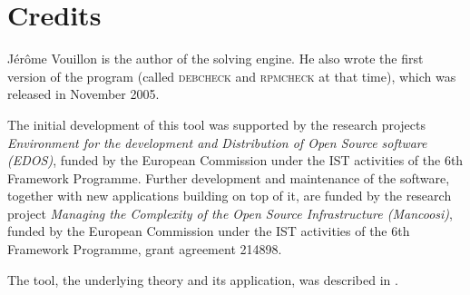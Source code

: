 \section{Credits}
\label{sec:credits}

Jérôme Vouillon is the author of the solving engine. He also wrote the
first version of the program (called \textsc{debcheck} and
\textsc{rpmcheck} at that time), which was released in November 2005.

The initial development of this tool was supported by the research
projects \emph{Environment for the development and Distribution of
  Open Source software (EDOS)}, funded by the European Commission
under the IST activities of the 6th Framework Programme. Further
development and maintenance of the software, together with new
applications building on top of it, are funded by the research project
\emph{Managing the Complexity of the Open Source Infrastructure
  (Mancoosi)}, funded by the European Commission under the IST
activities of the 6th Framework Programme, grant agreement 214898.

The tool, the underlying theory and its application, was described in
\cite{edos2006ase}.

